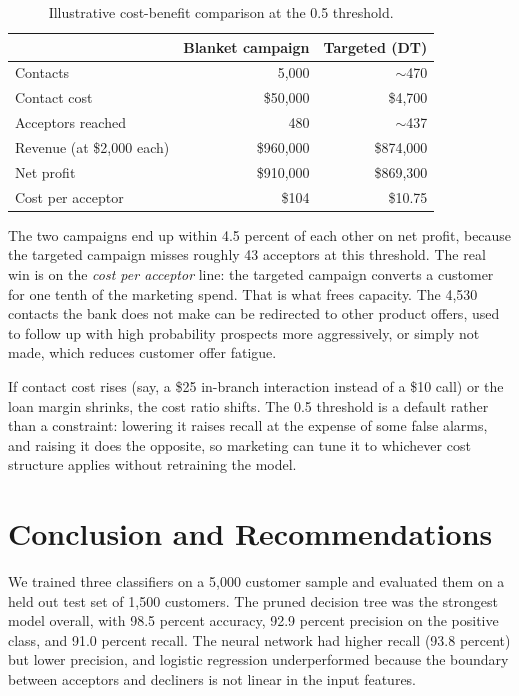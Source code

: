\documentclass[11pt, a4paper]{article}
\begin{document}
\begin{table}[H]
\centering
\caption{Illustrative cost-benefit comparison at the 0.5 threshold.}
\label{tab:cost_benefit}
\begin{tabular}{@{} l r r @{}}
\toprule
                              & Blanket campaign & Targeted (DT) \\
\midrule
Contacts                      & 5{,}000          & $\sim$470     \\
Contact cost                  & \$50{,}000       & \$4{,}700     \\
Acceptors reached             & 480              & $\sim$437     \\
Revenue (at \$2{,}000 each)   & \$960{,}000      & \$874{,}000   \\
Net profit                    & \$910{,}000      & \$869{,}300   \\
Cost per acceptor             & \$104            & \$10.75       \\
\bottomrule
\end{tabular}
\end{table}

The two campaigns end up within 4.5 percent of each other on net profit,
because the targeted campaign misses roughly 43 acceptors at this
threshold. The real win is on the \emph{cost per acceptor} line: the
targeted campaign converts a customer for one tenth of the marketing
spend. That is what frees capacity. The 4{,}530 contacts the bank does
not make can be redirected to other product offers, used to follow up
with high probability prospects more aggressively, or simply not made,
which reduces customer offer fatigue.

If contact cost rises (say, a \$25 in-branch interaction instead of a
\$10 call) or the loan margin shrinks, the cost ratio shifts. The 0.5
threshold is a default rather than a constraint: lowering it raises
recall at the expense of some false alarms, and raising it does the
opposite, so marketing can tune it to whichever cost structure applies
without retraining the model.

\section{Conclusion and Recommendations}

We trained three classifiers on a 5{,}000 customer sample and evaluated
them on a held out test set of 1{,}500 customers. The pruned decision tree
was the strongest model overall, with 98.5 percent accuracy, 92.9 percent
precision on the positive class, and 91.0 percent recall. The neural
network had higher recall (93.8 percent) but lower precision, and logistic
regression underperformed because the boundary between acceptors and
decliners is not linear in the input features.
\end{document}
